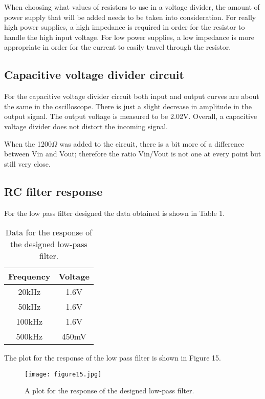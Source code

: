 \documentclass[12pt]{article}
\begin{document}
When choosing what values of resistors to use in a voltage divider, the
amount of power supply that will be added needs to be taken into
consideration. For really high power supplies, a high impedance is
required in order for the resistor to handle the high input voltage. For
low power supplies, a low impedance is more appropriate in order for the
current to easily travel through the resistor. 

\subsection {Capacitive voltage divider circuit}
For the capacitive voltage divider circuit both input and output curves
are about the same in the oscilloscope. There is just a slight decrease
in amplitude in the output signal. The output voltage is measured to be
2.02V. Overall, a capacitive voltage divider does not distort the
incoming signal.
 

When the 1200$\Omega$ was added to the circuit, there is a bit more of a
difference between Vin and Vout; therefore the  ratio Vin/Vout is not
one at every point but still very close.

\subsection {RC filter response}
For the low pass filter designed the data obtained is shown in Table 1.

\begin {table}[!h]
\center
\begin {tabular}{|c|c|}
\hline
Frequency     &     Voltage  \\
\hline
20kHz         &     1.6V     \\
\hline
50kHz         &     1.6V     \\
\hline
100kHz        &     1.6V     \\
\hline
500kHz        &     450mV    \\
\end {tabular}
\caption { Data for the response of the designed low-pass filter.}
\label {Table.1}
\end {table}

The plot for the response of the low pass filter is shown in Figure 15.
\begin {figure}[!h]
\centering
\texttt{[image: figure15.jpg]}
\caption{\label{rvd} A plot for the response of the designed low-pass filter.}
\end {figure}
\end{document}
